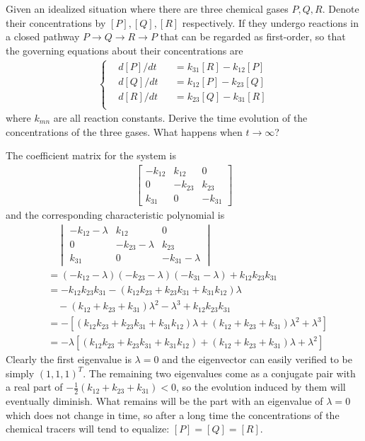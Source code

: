 \begin{Exercise}
Given an idealized situation where there are three chemical gases $P, Q, R$. Denote their concentrations by $[P], [Q], [R]$ respectively. If they undergo reactions in a closed pathway $P \to Q \to R \to P$ that can be regarded as first-order, so that the governing equations about their concentrations are
\begin{align*}
\left\{\begin{alignedat}{2}
&d[P]/dt& &= k_{31}[R] - k_{12}[P] \\
&d[Q]/dt& &= k_{12}[P] - k_{23}[Q] \\
&d[R]/dt& &= k_{23}[Q] - k_{31}[R] \\
\end{alignedat}\right.
\end{align*}
where $k_{mn}$ are all reaction constants. Derive the time evolution of the concentrations of the three gases. What happens when $t \to \infty$?
\end{Exercise}
\begin{Answer}
The coefficient matrix for the system is
\begin{align*}
\begin{bmatrix}
-k_{12} & k_{12} & 0 \\
0 & -k_{23} & k_{23} \\
k_{31} & 0 & -k_{31}
\end{bmatrix}
\end{align*}
and the corresponding characteristic polynomial is
\begin{align*}
&\quad \begin{vmatrix}
-k_{12}-\lambda & k_{12} & 0 \\
0 & -k_{23}-\lambda & k_{23} \\
k_{31} & 0 & -k_{31}-\lambda
\end{vmatrix} \\
&= (-k_{12}-\lambda)(-k_{23}-\lambda)(-k_{31}-\lambda) + k_{12}k_{23}k_{31} \\
&=  -k_{12}k_{23}k_{31} -(k_{12}k_{23} + k_{23}k_{31} + k_{31}k_{12})\lambda \\
&\quad - (k_{12}+k_{23}+k_{31})\lambda^2 - \lambda^3  + k_{12}k_{23}k_{31} \\
&= -[(k_{12}k_{23} + k_{23}k_{31} + k_{31}k_{12})\lambda + (k_{12}+k_{23}+k_{31})\lambda^2 + \lambda^3] \\
&= -\lambda[(k_{12}k_{23} + k_{23}k_{31} + k_{31}k_{12})+ (k_{12}+k_{23}+k_{31})\lambda +\lambda^2]
\end{align*}
Clearly the first eigenvalue is $\lambda = 0$ and the eigenvector can easily verified to be simply $(1,1,1)^T$. The remaining two eigenvalues come as a conjugate pair with a real part of $-\frac{1}{2}(k_{12}+k_{23}+k_{31}) < 0$, so the evolution induced by them will eventually diminish. What remains will be the part with an eigenvalue of $\lambda = 0$ which does not change in time, so after a long time the concentrations of the chemical tracers will tend to equalize: $[P] = [Q] = [R]$.
\end{Answer}